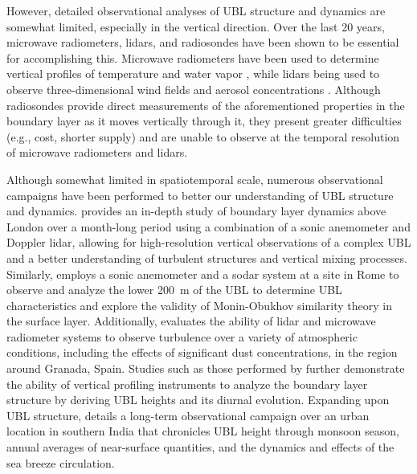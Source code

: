 \documentclass[num-refs]{wiley-article}
\begin{document}
However, detailed observational analyses of UBL structure and dynamics are somewhat limited, especially in the vertical direction. Over the last 20 years, microwave radiometers, lidars, and radiosondes have been shown to be essential for accomplishing this. Microwave radiometers have been used to determine vertical profiles of temperature and water vapor \citep{rose2005, wang2012}, while lidars being used to observe three-dimensional wind fields and aerosol concentrations \citep{grund2001}. Although radiosondes provide direct measurements of the aforementioned properties in the boundary layer as it moves vertically through it, they present greater difficulties (e.g., cost, shorter supply) and are unable to observe at the temporal resolution of microwave radiometers and lidars. 

Although somewhat limited in spatiotemporal scale, numerous observational campaigns have been performed to better our understanding of UBL structure and dynamics. \citet{barlow2011} provides an in-depth study of boundary layer dynamics above London over a month-long period using a combination of a sonic anemometer and Doppler lidar, allowing for high-resolution vertical observations of a complex UBL and a better understanding of turbulent structures and vertical mixing processes. Similarly, \citet{pelliccioni2012} employs a sonic anemometer and a sodar system at a site in Rome to observe and analyze the lower \SI{200}{\meter} of the UBL to determine UBL characteristics and explore the validity of Monin-Obukhov similarity theory in the surface layer. Additionally, \citet{dearrudamoreira2020} evaluates the ability of lidar and microwave radiometer systems to observe turbulence over a variety of atmospheric conditions, including the effects of significant dust concentrations, in the region around Granada, Spain. Studies such as those performed by \citet{banks2015, quan2013, wang2012} further demonstrate the ability of vertical profiling instruments to analyze the boundary layer structure by deriving UBL heights and its diurnal evolution. Expanding upon UBL structure, \citet{anurose2018} details a long-term observational campaign over an urban location in southern India that chronicles UBL height through monsoon season, annual averages of near-surface quantities, and the dynamics and effects of the sea breeze circulation. 
\end{document}
